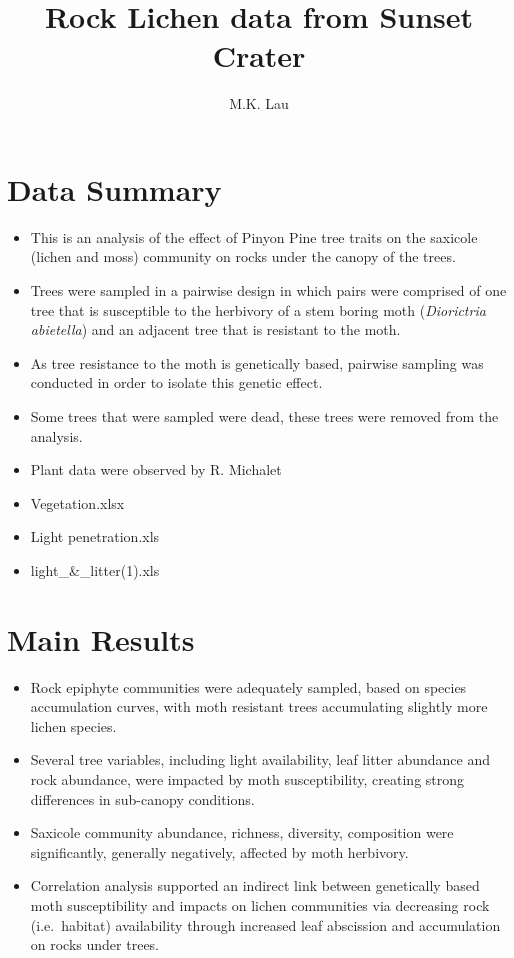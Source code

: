 \documentclass[]{article}
\title{Rock Lichen data from Sunset Crater}
\author{M.K. Lau}
\date{}
\providecommand{\tightlist}{%
  \setlength{\itemsep}{0pt}\setlength{\parskip}{0pt}}
\begin{document}
\maketitle

\section{Data Summary}\label{data-summary}

\begin{itemize}
\tightlist
\item
  This is an analysis of the effect of Pinyon Pine tree traits on the
  saxicole (lichen and moss) community on rocks under the canopy of the
  trees.
\item
  Trees were sampled in a pairwise design in which pairs were comprised
  of one tree that is susceptible to the herbivory of a stem boring moth
  (\emph{Diorictria abietella}) and an adjacent tree that is resistant
  to the moth.
\item
  As tree resistance to the moth is genetically based, pairwise sampling
  was conducted in order to isolate this genetic effect.
\item
  Some trees that were sampled were dead, these trees were removed from
  the analysis.
\item
  Plant data were observed by R. Michalet
\item
  Vegetation.xlsx
\item
  Light penetration.xls
\item
  light\_\&\_litter(1).xls
\end{itemize}

\section{Main Results}\label{main-results}

\begin{itemize}
\tightlist
\item
  Rock epiphyte communities were adequately sampled, based on species
  accumulation curves, with moth resistant trees accumulating slightly
  more lichen species.
\item
  Several tree variables, including light availability, leaf litter
  abundance and rock abundance, were impacted by moth susceptibility,
  creating strong differences in sub-canopy conditions.
\item
  Saxicole community abundance, richness, diversity, composition were
  significantly, generally negatively, affected by moth herbivory.
\item
  Correlation analysis supported an indirect link between genetically
  based moth susceptibility and impacts on lichen communities via
  decreasing rock (i.e.~habitat) availability through increased leaf
  abscission and accumulation on rocks under trees.
\end{itemize}
\end{document}
